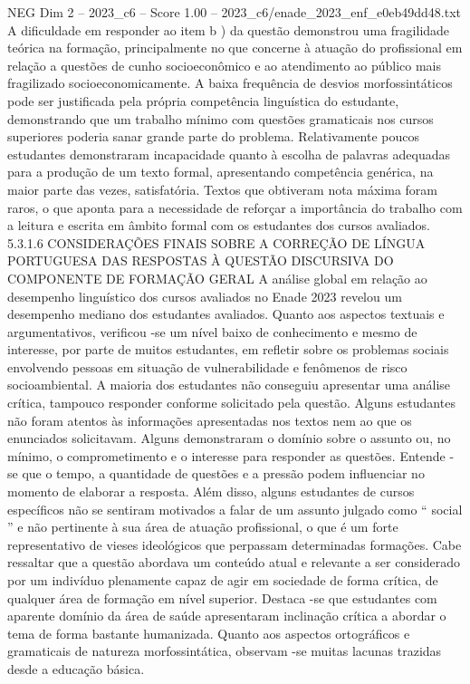\begin{textsample}{NEG Dim 2 – 2023\_c6 – Score 1.00 – 2023\_c6/enade\_2023\_enf\_e0eb49dd48.txt}
A dificuldade em responder ao item b ) da questão demonstrou uma fragilidade teórica na formação, principalmente no que concerne à atuação do profissional em relação a questões de cunho socioeconômico e ao atendimento ao público mais fragilizado socioeconomicamente.
A baixa frequência de desvios morfossintáticos pode ser justificada pela própria competência linguística do estudante, demonstrando que um trabalho mínimo com questões gramaticais nos cursos superiores poderia sanar grande parte do problema.
Relativamente poucos estudantes demonstraram incapacidade quanto à escolha de palavras adequadas para a produção de um texto formal, apresentando competência genérica, na maior parte das vezes, satisfatória.
Textos que obtiveram nota máxima foram raros, o que aponta para a necessidade de reforçar a importância do trabalho com a leitura e escrita em âmbito formal com os estudantes dos cursos avaliados. 5.3.1.6 CONSIDERAÇÕES FINAIS SOBRE A CORREÇÃO DE LÍNGUA PORTUGUESA DAS RESPOSTAS À QUESTÃO DISCURSIVA DO COMPONENTE DE FORMAÇÃO GERAL A análise global em relação ao desempenho linguístico dos cursos avaliados no Enade 2023 revelou um desempenho mediano dos estudantes avaliados.
Quanto aos aspectos textuais e argumentativos, verificou -se um nível baixo de conhecimento e mesmo de interesse, por parte de muitos estudantes, em refletir sobre os problemas sociais envolvendo pessoas em situação de vulnerabilidade e fenômenos de risco socioambiental.
A maioria dos estudantes não conseguiu apresentar uma análise crítica, tampouco responder conforme solicitado pela questão.
Alguns estudantes não foram atentos às informações apresentadas nos textos nem ao que os enunciados solicitavam.
Alguns demonstraram o domínio sobre o assunto ou, no mínimo, o comprometimento e o interesse para responder as questões.
Entende -se que o tempo, a quantidade de questões e a pressão podem influenciar no momento de elaborar a resposta.
Além disso, alguns estudantes de cursos específicos não se sentiram motivados a falar de um assunto julgado como “ social ” e não pertinente à sua área de atuação profissional, o que é um forte representativo de vieses ideológicos que perpassam determinadas formações.
Cabe ressaltar que a questão abordava um conteúdo atual e relevante a ser considerado por um indivíduo plenamente capaz de agir em sociedade de forma crítica, de qualquer área de formação em nível superior.
Destaca -se que estudantes com aparente domínio da área de saúde apresentaram inclinação crítica a abordar o tema de forma bastante humanizada.
Quanto aos aspectos ortográficos e gramaticais de natureza morfossintática, observam -se muitas lacunas trazidas desde a educação básica.

\end{textsample}
